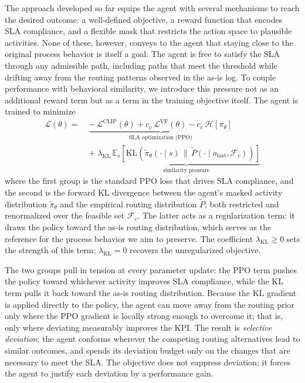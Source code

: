 \documentclass[journal,onecolumn]{IEEEtran}
\begin{document}
The approach developed so far equips the agent with several
mechanisms to reach the desired outcome: a well-defined objective, a
reward function that encodes SLA compliance, and a flexible mask that
restricts the action space to plausible activities. None of these,
however, conveys to the agent that staying close to the original
process behavior is itself a goal. The agent is free to satisfy the
SLA through any admissible path, including paths that meet the
threshold while drifting away from the routing patterns observed in
the as-is log. To couple performance with behavioral similarity, we
introduce this pressure not as an additional reward term but as a
term in the training objective itself. The agent is trained to
minimize
%
\[
\begin{aligned}
\mathcal{L}(\theta) =\;
& \underbrace{-\,\mathcal{L}^{\mathrm{CLIP}}(\theta)
  + c_v\,\mathcal{L}^{\mathrm{VF}}(\theta)
  - c_e\,\mathcal{H}[\pi_\theta]}_{\text{SLA optimization (PPO)}} \\[4pt]
& +\;
  \lambda_{\text{KL}}\,
  \underbrace{\mathbb{E}_s\!\left[
  \mathrm{KL}\!\left(
  \tilde\pi_\theta(\cdot\mid s)\,\big\|\,
  \tilde P(\cdot\mid a_{\text{last}},\mathcal{F}_c)
  \right)\right]}_{\text{similarity pressure}}
\end{aligned}
\]
%
where the first group is the standard PPO loss that drives SLA
compliance, and the second is the forward KL divergence between the
agent's masked activity distribution $\tilde\pi_\theta$ and the
empirical routing distribution $\tilde P$, both restricted and
renormalized over the feasible set $\mathcal{F}_c$. The latter acts as
a regularization term: it draws the policy toward the as-is routing
distribution, which serves as the reference for the process behavior
we aim to preserve. The coefficient $\lambda_{\text{KL}}\ge 0$ sets the
strength of this term; $\lambda_{\text{KL}}=0$ recovers the
unregularized objective.

The two groups pull in tension at every parameter update: the PPO term
pushes the policy toward whichever activity improves SLA compliance,
while the KL term pulls it back toward the as-is routing distribution.
Because the KL gradient is applied directly to the policy, the agent
can move away from the routing prior only where the PPO gradient is
locally strong enough to overcome it; that is, only where deviating
measurably improves the KPI. The result is \emph{selective deviation}:
the agent conforms wherever the competing routing alternatives lead to
similar outcomes, and spends its deviation budget only on the changes
that are necessary to meet the SLA. The objective does not suppress
deviation; it forces the agent to justify each deviation by a
performance gain.
\end{document}
